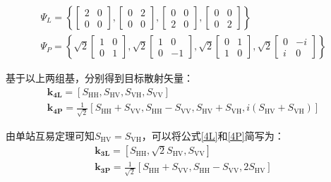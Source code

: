 \begin{gather}
    \Psi_L=\left\{\left[\begin{array}{ll}
            2 & 0 \\
            0 & 0
        \end{array}\right],\left[\begin{array}{ll}
            0 & 2 \\
            0 & 0
        \end{array}\right],\left[\begin{array}{ll}
            0 & 0 \\
            2 & 0
        \end{array}\right],\left[\begin{array}{ll}
            0 & 0 \\
            0 & 2
        \end{array}\right]\right\}                                    \\
    \Psi_P=\left\{\sqrt{2}\left[\begin{array}{ll}
            1 & 0 \\
            0 & 1
        \end{array}\right], \sqrt{2}\left[\begin{array}{cc}
            1 & 0  \\
            0 & -1
        \end{array}\right], \sqrt{2}\left[\begin{array}{ll}
            0 & 1 \\
            1 & 0
        \end{array}\right], \sqrt{2}\left[\begin{array}{cc}
            0 & -i \\
            i & 0
        \end{array}\right]\right\}
\end{gather}

基于以上两组基，分别得到目标散射矢量：
\begin{gather}
    \label{4L}
    \textbf{k}_{\textbf{4L}}=\left[S_{\mathrm{HH}}, S_{\mathrm{HV}}, S_{\mathrm{VH}}, S_{\mathrm{VV}}\right] \\
    \label{4P}
    \textbf{k}_{\textbf{4P}}=\frac{1}{\sqrt{2}}\left[S_{\mathrm{HH}}+S_{\mathrm{VV}}, S_{\mathrm{HH}}-S_{\mathrm{VV}}, S_{\mathrm{HV}}+S_{\mathrm{VH}}, i\left(S_{\mathrm{HV}}+S_{\mathrm{VH}}\right)\right]
\end{gather}

由单站互易定理可知$S_{\mathrm{HV}}=S_{\mathrm{VH}}$，可以将公式\eqref{4L}和\eqref{4P}简写为：
\begin{equation}
    \begin{gathered}
        \textbf{k}_{\textbf{3L}}=\left[S_{\mathrm{HH}}, \sqrt{2}S_{\mathrm{HV}}, S_{\mathrm{VV}}\right] \\
        \textbf{k}_{\textbf{3P}}=\frac{1}{\sqrt{2}}\left[S_{\mathrm{HH}}+S_{\mathrm{VV}}, S_{\mathrm{HH}}-S_{\mathrm{VV}}, 2S_{\mathrm{HV}}\right]
    \end{gathered}
\end{equation}

